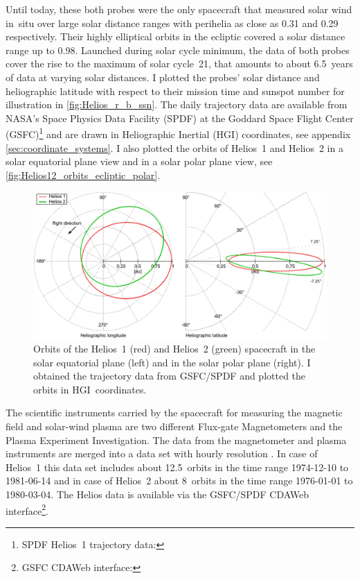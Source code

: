 Until today, these both probes were the only spacecraft that measured solar wind in~situ over large solar distance ranges with perihelia as close as \SI{0.31}{\au} and \SI{0.29}{\au} respectively. Their highly elliptical orbits in the ecliptic covered a solar distance range up to \SI{0.98}{\au}. Launched during solar cycle minimum, the data of both probes cover the rise to the maximum of solar cycle~21, that amounts to about 6.5~years of data at varying solar distances. I plotted the probes' solar distance and heliographic latitude with respect to their mission time and sunspot number for illustration in \autoref{fig:Helios_r_b_ssn}. The daily trajectory data are available from NASA's Space Physics Data Facility (SPDF) at the Goddard Space Flight Center (GSFC)\protect\footnote{SPDF Helios~1 trajectory data: } and are drawn in Heliographic Inertial (HGI) coordinates, see appendix \autoref{sec:coordinate_systems}. I also plotted the orbits of Helios~1 and Helios~2 in a solar equatorial plane view and in a solar polar plane view, see \autoref{fig:Helios12_orbits_ecliptic_polar}.
\begin{figure}[htb]
	\centering
	\includegraphics[width=\textwidth]{figures_of_mine/gnuplots/Helios12_orbits_ecliptic_polar.pdf}
	\caption[]
	{Orbits of the Helios~1 (red) and Helios~2 (green) spacecraft in the solar equatorial plane (left) and in the solar polar plane (right). I obtained the trajectory data from GSFC/SPDF and plotted the orbits in HGI~coordinates.}
	\label{fig:Helios12_orbits_ecliptic_polar}
\end{figure}

The scientific instruments carried by the spacecraft for measuring the magnetic field and solar-wind plasma are two different Flux-gate Magnetometers and the Plasma Experiment Investigation. The data from the magnetometer and plasma instruments are merged into a data set with hourly resolution \citep{Rosenbauer1977}. In case of Helios~1 this data set includes about 12.5~orbits in the time range \mbox{1974-12-10} to \mbox{1981-06-14} and in case of Helios~2 about 8~orbits in the time range \mbox{1976-01-01} to \mbox{1980-03-04}. The Helios data is available via the GSFC/SPDF CDAWeb interface\footnote{GSFC CDAWeb interface: }.

